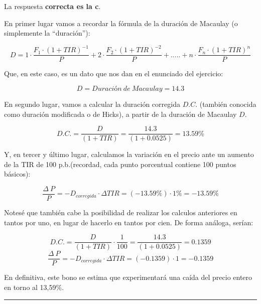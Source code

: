 \documentclass[
  letterpaper,
  DIV=11,
  numbers=noendperiod]{scrreprt}
\begin{document}
\begin{tcolorbox}[enhanced jigsaw, left=2mm, opacityback=0, colback=white, breakable, arc=.35mm, bottomrule=.15mm, rightrule=.15mm, toprule=.15mm, leftrule=.75mm, colframe=quarto-callout-tip-color-frame]
\begin{minipage}[t]{5.5mm}
\textcolor{quarto-callout-tip-color}{\faLightbulb}
\end{minipage}%
\begin{minipage}[t]{\textwidth - 5.5mm}

La respuesta \textbf{correcta es la c}.

En primer lugar vamos a recordar la fórmula de la duración de Macaulay
(o simplemente la ``duración''):

\[D=1\cdot\frac{F_1\cdot\left(1+TIR\right)^{-1}}{P}+2\cdot\frac{F_2\cdot\left(1+TIR\right)^{-2}}{P}+.....+n\cdot\frac{F_n\cdot\left(1+TIR\right)^n}{P}\]

Que, en este caso, es un dato que nos dan en el enunciado del ejercicio:

\[D=Duración\ de\ Macaulay=14.3\]

En segundo lugar, vamos a calcular la duración corregida \(D.C.\)
(también conocida como duración modificada o de Hicks), a partir de la
duración de Macaulay \(D\).

\[D.C.=\frac{D}{(1+TIR)}=\frac{14.3}{(1+0.0525)}=13.59\%\]

Y, en tercer y último lugar, calculamos la variación en el precio ante
un aumento de la TIR de 100 p.b.(recordad, cada punto porcentual
contiene 100 puntos básicos):

\[\frac{\Delta\ P}{P}=-D_{corregida}\cdot\Delta TIR=(-13.59\%)\cdot 1\%=-13.59\% \]

Notesé que también cabe la posibilidad de realizar los calculos
anteriores en tantos por uno, en lugar de hacerlo en tantos por cien. De
forma análoga, serían:

\[D.C.=\frac{D}{(1+TIR)}\cdot \frac{1}{100}=\frac{14.3}{(1+0.0525)}=0.1359\]
\[\frac{\Delta\ P}{P}=-D_{corregida}\cdot\Delta TIR=(-0.1359)\cdot 1=-0.1359\]

En definitiva, este bono se estima que experimentará una caída del
precio entero en torno al 13,59\%.

\end{minipage}%
\end{tcolorbox}

\begin{center}\rule{0.5\linewidth}{0.5pt}\end{center}
\end{document}
